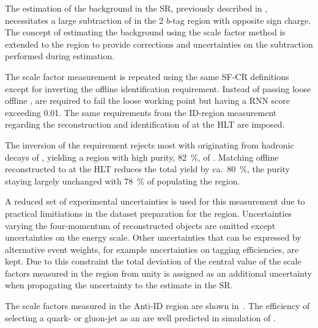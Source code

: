 The estimation of the \multijet background in the \hadhad SR,
previously described in , necessitates a
large subtraction of \ttbarFakes in the 2 $b$-tag \antiid region with
opposite sign \tauhadvis charge. The concept of estimating the
\ttbarFakes background using the scale factor method is extended to
the \antiid region to provide corrections and uncertainties on the
subtraction performed during \multijet estimation.

The scale factor measurement is repeated using the same SF-CR
definitions except for inverting the offline \tauhadvis identification
requirement. Instead of \tauhadvis passing loose offline \tauid,
\tauhadvis are required to fail the loose working point but having a
RNN \tauid score exceeding \num{0.01}. The same requirements from the
ID-region measurement regarding the reconstruction and identification
of \tauhadvis at the HLT are imposed.

The inversion of the \tauid requirement rejects most \ttbar with
\tauhadvis originating from hadronic decays of \tauleptons, yielding a
region with high purity, \SI{82}{\percent}, of \ttbarFakes. Matching
offline reconstructed \tauhadvis to \tauhadvis at the HLT reduces the
total \ttbarFakes yield by ca.\ \SI{80}{\percent}, the purity staying
largely unchanged with \SI{78}{\percent} of \ttbarFakes populating the
\antiid region.

A reduced set of experimental uncertainties is used for this
measurement due to practical limitiations in the dataset preparation
for the \lephad \antiid region. Uncertainties varying the
four-momentum of reconstructed objects are omitted except
uncertainties on the \tauhadvis energy scale. Other uncertainties that
can be expressed by alternative event weights, for example
uncertainties on tagging efficiencies, are kept. Due to this
constraint the total deviation of the central value of the scale
factors measured in the \antiid region from unity is assigned as an
additional uncertainty when propagating the uncertainty to the
\multijet estimate in the \hadhad SR.

The scale factors measured in the Anti-ID region are shown
in~. The efficiency of selecting a quark-
or gluon-jet as an \antitau are well predicted in simulation of
\ttbar.

